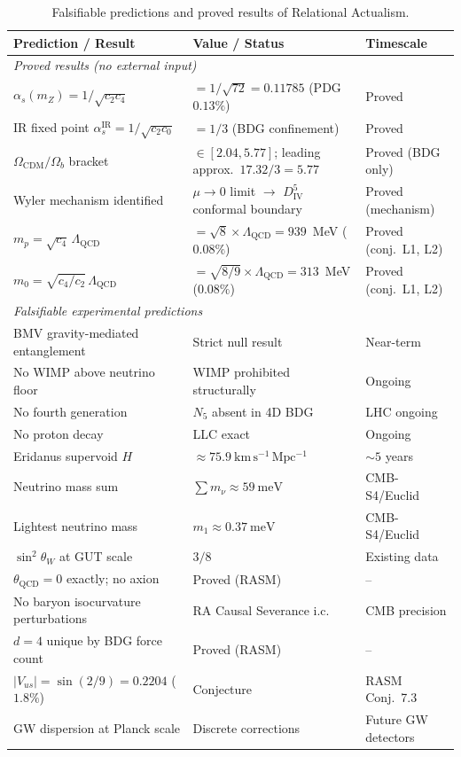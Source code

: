 \documentclass[11pt,a4paper]{article}
\begin{document}
\begin{table}[ht]
\centering
\caption{Falsifiable predictions and proved results of Relational Actualism.}
\label{tab:predictions}
\renewcommand{\arraystretch}{1.3}
\begin{tabular}{p{5.2cm}p{4.5cm}p{3.5cm}}
\toprule
Prediction / Result & Value / Status & Timescale \\
\midrule
\multicolumn{3}{l}{\textit{Proved results (no external input)}} \\
$\alpha_s(m_Z) = 1/\sqrt{c_2 c_4}$ & $= 1/\sqrt{72} = 0.11785$ (PDG $0.13\%$) & Proved \\
IR fixed point $\alpha_s^{\mathrm{IR}} = 1/\sqrt{c_2 c_0}$ & $= 1/3$ (BDG confinement) & Proved \\
$\Omega_{\mathrm{CDM}}/\Omega_b$ bracket & $\in [2.04, 5.77]$; leading approx.\ $17.32/3 = 5.77$ & Proved (BDG only) \\
Wyler mechanism identified & $\mu\to 0$ limit $\to$ $D_{\mathrm{IV}}^5$ conformal boundary & Proved (mechanism) \\
$m_p = \sqrt{c_4}\,\Lambda_{\mathrm{QCD}}$ & $= \sqrt{8}\times\Lambda_{\mathrm{QCD}} = 939$~MeV ($0.08\%$) & Proved (conj.\ L1, L2) \\
$m_0 = \sqrt{c_4/c_2}\,\Lambda_{\mathrm{QCD}}$ & $= \sqrt{8/9}\times\Lambda_{\mathrm{QCD}} = 313$~MeV ($0.08\%$) & Proved (conj.\ L1, L2) \\
\midrule
\multicolumn{3}{l}{\textit{Falsifiable experimental predictions}} \\
BMV gravity-mediated entanglement & Strict null result & Near-term \\
No WIMP above neutrino floor & WIMP prohibited structurally & Ongoing \\
No fourth generation & $N_5$ absent in 4D BDG & LHC ongoing \\
No proton decay & LLC exact & Ongoing \\
Eridanus supervoid $H$ & $\approx 75.9~\mathrm{km\,s^{-1}\,Mpc^{-1}}$ & $\sim 5$ years \\
Neutrino mass sum & $\sum m_\nu \approx 59~\mathrm{meV}$ & CMB-S4/Euclid \\
Lightest neutrino mass & $m_1 \approx 0.37~\mathrm{meV}$ & CMB-S4/Euclid \\
$\sin^2\theta_W$ at GUT scale & $3/8$ & Existing data \\
$\theta_{\mathrm{QCD}} = 0$ exactly; no axion & Proved (RASM) & -- \\
No baryon isocurvature perturbations & RA Causal Severance i.c. & CMB precision \\
$d = 4$ unique by BDG force count & Proved (RASM) & -- \\
$|V_{us}| = \sin(2/9) = 0.2204$ ($1.8\%$) & Conjecture & RASM Conj.~7.3 \\
GW dispersion at Planck scale & Discrete corrections & Future GW detectors \\
\bottomrule
\end{tabular}
\end{table}
\end{document}
